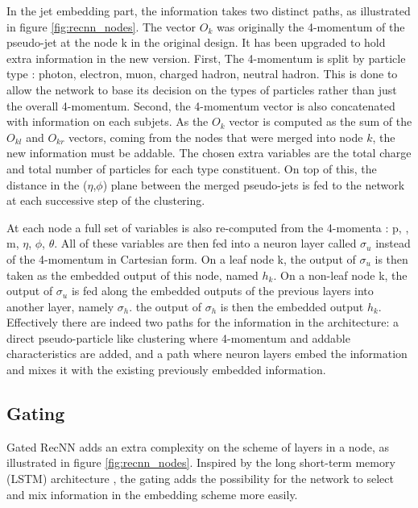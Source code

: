 In the jet embedding part, the information takes two distinct paths, as illustrated in figure \ref{fig:recnn_nodes}.
The vector $O_k$ was originally the 4-momentum of the pseudo-jet at the node k in the original design. It has been upgraded to hold extra information in the new version. First, The 4-momentum is split by particle type : photon, electron, muon, charged hadron, neutral hadron. This is done to allow the network to base its decision on the types of particles rather than just the overall 4-momentum. Second, the 4-momentum vector is also concatenated with information on each subjets. As the $O_k$ vector is computed as the sum of the $O_{kl}$ and $O_{kr}$ vectors, coming from the nodes that were merged into node $k$, the new information must be addable. The chosen extra variables are the total charge and total number of particles for each type constituent. On top of this, the distance in the ($\eta$,$\phi$) plane between the merged pseudo-jets is fed to the network at each successive step of the clustering. 

At each node a full set of variables is also re-computed from the 4-momenta : p, \pt, m, $\eta$, $\phi$, $\theta$. All of these variables are then fed into a neuron layer called $\sigma_{u}$ instead of the 4-momentum in Cartesian form.
On a leaf node k, the output of $\sigma_{u}$ is then taken as the embedded output of this node, named $h_k$.
On a non-leaf node k, the output of $\sigma_{u}$ is fed along the embedded outputs of the previous layers into another layer, namely $\sigma_h$. the output of $\sigma_h$ is then the embedded output $h_k$.
Effectively there are indeed two paths for the information in the architecture: a direct pseudo-particle like clustering where 4-momentum and addable characteristics are added, and a path where neuron layers embed the information and mixes it with the existing previously embedded information.

\subsection{Gating}

Gated RecNN adds an extra complexity on the scheme of layers in a node, as illustrated in figure \ref{fig:recnn_nodes}. Inspired by the long short-term memory (LSTM) architecture \cite{lstm}, the gating adds the possibility for the network to select and mix information in the embedding scheme more easily. 

